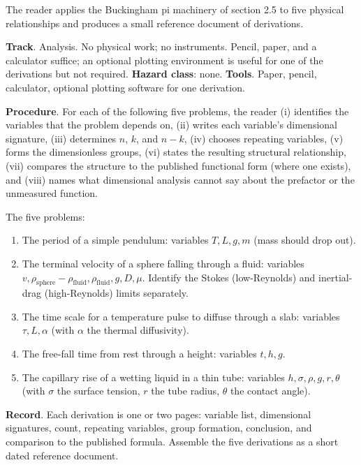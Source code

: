 \begin{project}
The reader applies the Buckingham pi machinery of section 2.5 to
five physical relationships and produces a small reference document
of derivations.

\textbf{Track}. Analysis. No physical work; no instruments. Pencil,
paper, and a calculator suffice; an optional plotting environment is
useful for one of the derivations but not required.
\textbf{Hazard class}: none.
\textbf{Tools}. Paper, pencil, calculator, optional plotting
software for one derivation.

\textbf{Procedure}. For each of the following five problems, the
reader (i) identifies the variables that the problem depends on,
(ii) writes each variable's dimensional signature, (iii) determines
$n$, $k$, and $n - k$, (iv) chooses repeating variables, (v) forms
the dimensionless groups, (vi) states the resulting structural
relationship, (vii) compares the structure to the published
functional form (where one exists), and (viii) names what
dimensional analysis cannot say about the prefactor or the
unmeasured function.

The five problems:

\begin{enumerate}[leftmargin=*]
  \item The period of a simple pendulum: variables $T, L, g, m$
    (mass should drop out).
  \item The terminal velocity of a sphere falling through a fluid:
    variables $v, \rho_{\text{sphere}} - \rho_{\text{fluid}}, \rho_
    {\text{fluid}}, g, D, \mu$. Identify the Stokes (low-Reynolds)
    and inertial-drag (high-Reynolds) limits separately.
  \item The time scale for a temperature pulse to diffuse through a
    slab: variables $\tau, L, \alpha$ (with $\alpha$ the thermal
    diffusivity).
  \item The free-fall time from rest through a height: variables
    $t, h, g$.
  \item The capillary rise of a wetting liquid in a thin tube:
    variables $h, \sigma, \rho, g, r, \theta$ (with $\sigma$ the
    surface tension, $r$ the tube radius, $\theta$ the contact
    angle).
\end{enumerate}

\textbf{Record}. Each derivation is one or two pages: variable list,
dimensional signatures, count, repeating variables, group formation,
conclusion, and comparison to the published formula. Assemble the
five derivations as a short dated reference document.


\end{project}
